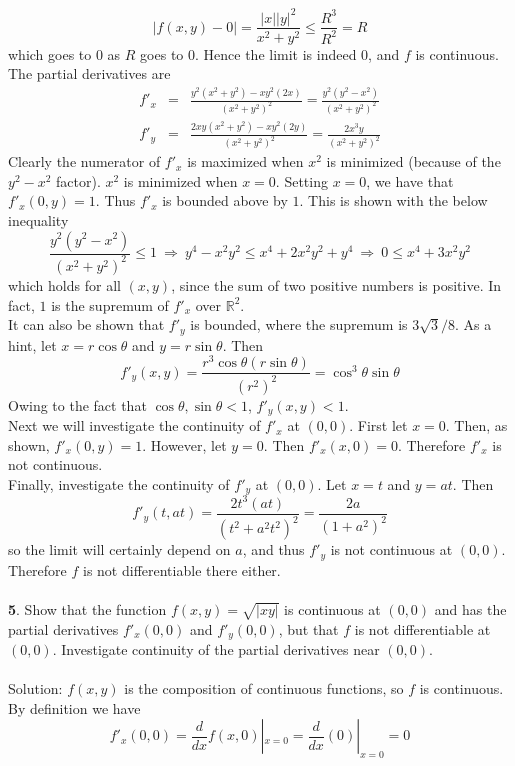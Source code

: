 \documentclass[12pt]{amsbook}
\begin{document}
$$|f(x,y)-0|=\frac{|x||y|^2}{x^2+y^2}\leq \frac{R^3}{R^2}=R$$
which goes to $0$ as $R$ goes to $0$. Hence the limit is indeed $0$, and $f$ is continuous.
\\
The partial derivatives are
\begin{eqnarray*}
f'_x&=&\frac{y^2(x^2+y^2)-xy^2(2x)}{(x^2+y^2)^2}=\frac{y^2(y^2-x^2)}{(x^2+y^2)^2} \\
f'_y&=&\frac{2xy(x^2+y^2)-xy^2(2y)}{(x^2+y^2)^2}=\frac{2x^3y}{(x^2+y^2)^2}
\end{eqnarray*}
Clearly the numerator of $f'_x$ is maximized when $x^2$ is minimized (because of the $y^2-x^2$ factor). $x^2$ is minimized when $x=0$. Setting $x=0$, we have that $f'_x(0,y)=1$. Thus $f'_x$ is bounded above by $1$. This is shown with the below inequality
$$\frac{y^2(y^2-x^2)}{(x^2+y^2)^2}\leq 1 \ \Rightarrow \ y^4-x^2y^2 \leq x^4+2x^2y^2+y^4 \ \Rightarrow \ 0 \leq x^4+3x^2y^2$$
which holds for all $(x,y)$, since the sum of two positive numbers is positive. In fact, $1$ is the supremum of $f'_x$ over $\mathbb{R}^2$.
\\
It can also be shown that $f'_y$ is bounded, where the supremum is $3\sqrt{3}/8$. As a hint, let $x=r\cos \theta$ and $y=r\sin \theta$. Then 
$$f'_y(x,y)=\frac{r^3\cos \theta (r\sin \theta)}{(r^2)^2}=\cos^3 \theta \sin \theta$$
Owing to the fact that $\cos \theta, \sin \theta <1$, $f'_y(x,y)<1$. 
\\
Next we will investigate the continuity of $f'_x$ at $(0,0)$. First let $x=0$. Then, as shown, $f'_x(0,y)=1$. However, let $y=0$. Then $f'_x(x,0)=0$. Therefore $f'_x$ is not continuous.
\\
Finally, investigate the continuity of $f'_y$ at $(0,0)$. Let $x=t$ and $y=at$. Then 
$$f'_y(t,at)=\frac{2t^3(at)}{(t^2+a^2t^2)^2}=\frac{2a}{(1+a^2)^2}$$
so the limit will certainly depend on $a$, and thus $f'_y$ is not continuous at $(0,0)$. Therefore $f$ is not differentiable there either.
\\
\\
{\small\bf 5}. Show that the function $f(x, y) = \sqrt{|xy|}$ is continuous at $(0, 0)$ and has the partial derivatives $f'_x(0,0)$ and $f'_y(0,0)$, but that $f$ is not differentiable at $(0, 0)$. Investigate continuity of the partial derivatives near
$(0, 0)$.
\\
\\
{\sc Solution}: $f(x,y)$ is the composition of continuous functions, so $f$ is continuous. 
\\
By definition we have
$$f'_x(0,0)=\frac{d}{dx}f(x,0)|_{x=0}=\frac{d}{dx}(0)|_{x=0}=0$$
\end{document}
